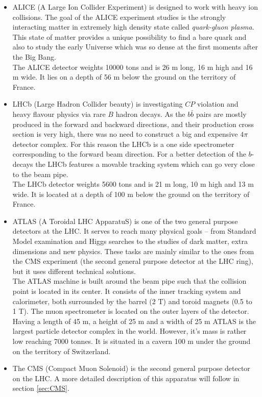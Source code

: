 \begin{itemize}
 \item ALICE (A Large Ion Collider Experiment)\cite{ALICEtdr} is designed to
 work with heavy ion collisions. The goal of the ALICE experiment studies is
 the strongly interacting matter in extremely high density state called \textit{quark-gluon plasma}. This 
 state of matter provides a unique possibility to find a bare quark and also to study the early
 Universe which was so dense at the first moments after the Big Bang.
 \\
 The ALICE detector weights 10000 tons and is 26 m long, 16 m high and 16 m wide. It lies on a depth of
 56 m below the ground on the territory of France.
 
 \item LHCb (Large Hadron Collider beauty)\cite{LHCb} is investigating $CP$ violation and heavy flavour physics via
 rare $B$ hadron decays. As the $b\bar{b}$ pairs are mostly produced in the forward and backward directions, 
 and their production cross section is very high, there was no need to construct a big and expensive $4\pi$ detector 
 complex. For this reason the LHCb is a one side spectrometer corresponding to the forward beam direction.
 For a better detection of the $b$-decays the LHCb features a movable tracking system which can go very close
 to the beam pipe.
 \\
 The LHCb detector weights 5600 tons and is 21 m long, 10 m high and 13 m wide. It is located at a depth of 100 m 
 below the ground on the territory of France.
 
 \item ATLAS (A Toroidal LHC ApparatuS)\cite{ATLAS} is one of the two general purpose detectors at the LHC. It serves to reach many physical
 goals -- from Standard Model examination and Higgs searches to the studies of dark matter, extra dimensions and new physics.
 These tasks are mainly similar to the ones from the CMS experiment (the second general purpose detector at the LHC ring), but
 it uses different technical solutions.
 \\
 The ATLAS machine is built around the beam pipe such that the collision point is located in its center. It consists of the 
 inner tracking system and calorimeter, both surrounded by the barrel (2 T) and toroid magnets (0.5 to 1 T). The muon spectrometer
 is located on the outer layers of the detector.
 \\
 Having a length of 45 m, a height of 25 m and a width of 25 m ATLAS is the largest particle detector complex in the world. However, it's mass 
 is rather low reaching 7000 tonnes. It is situated in a cavern 100 m under the ground on the territory of Switzerland.
 
 \item The CMS (Compact Muon Solenoid) is the second general purpose detector on the LHC. A more detailed description of this apparatus will follow in
 section \ref{sec:CMS}.
 
\end{itemize}


